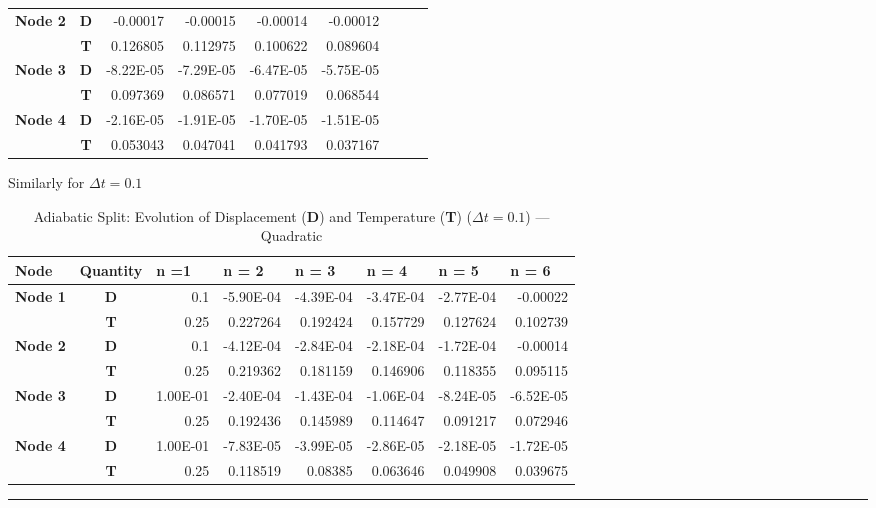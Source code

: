 \begin{table}[htbp]
\begin{tabular}{rcrrrrrrr}
    \multicolumn{1}{l}{\textbf{Node 2}} & \textbf{D} & -0.00017 & -0.00015 & -0.00014 & -0.00012 &       &       &  \\
          & \textbf{T} & 0.126805 & 0.112975 & 0.100622 & 0.089604 &       &       &  \\
    \multicolumn{1}{l}{\textbf{Node 3}} & \textbf{D} & -8.22E-05 & -7.29E-05 & -6.47E-05 & -5.75E-05 &       &       &  \\
          & \textbf{T} & 0.097369 & 0.086571 & 0.077019 & 0.068544 &       &       &  \\
    \multicolumn{1}{l}{\textbf{Node 4}} & \textbf{D} & -2.16E-05 & -1.91E-05 & -1.70E-05 & -1.51E-05 &       &       &  \\
          & \textbf{T} & 0.053043 & 0.047041 & 0.041793 & 0.037167 &       &       &  \\
\cmidrule{1-6}    \end{tabular}%
  \label{tab:addlabel}%
\end{table}
Similarly for $\Delta t = 0.1$
\begin{table}[htbp]
  \centering
  \caption{Adiabatic Split: Evolution of Displacement ({\bf D}) and Temperature ({\bf T}) ($\Delta t = 0.1$) --- Quadratic}
    \begin{tabular}{rcrrrrrr}
    \toprule
    \multicolumn{1}{l}{\textbf{Node }} & \multicolumn{1}{l}{\textbf{Quantity}} & \multicolumn{1}{l}{\textbf{n =1 }} & \multicolumn{1}{l}{\textbf{n = 2 }} & \multicolumn{1}{l}{\textbf{n = 3}} & \multicolumn{1}{l}{\textbf{n = 4}} & \multicolumn{1}{l}{\textbf{n = 5}} & \multicolumn{1}{l}{\textbf{n = 6}} \\
    \midrule
    \multicolumn{1}{l}{\textbf{Node 1}} & \textbf{D} & 0.1   & -5.90E-04 & -4.39E-04 & -3.47E-04 & -2.77E-04 & -0.00022 \\
          & \textbf{T} & 0.25  & 0.227264 & 0.192424 & 0.157729 & 0.127624 & 0.102739 \\
    \multicolumn{1}{l}{\textbf{Node 2}} & \textbf{D} & 0.1   & -4.12E-04 & -2.84E-04 & -2.18E-04 & -1.72E-04 & -0.00014 \\
          & \textbf{T} & 0.25  & 0.219362 & 0.181159 & 0.146906 & 0.118355 & 0.095115 \\
    \multicolumn{1}{l}{\textbf{Node 3}} & \textbf{D} & 1.00E-01 & -2.40E-04 & -1.43E-04 & -1.06E-04 & -8.24E-05 & -6.52E-05 \\
          & \textbf{T} & 0.25  & 0.192436 & 0.145989 & 0.114647 & 0.091217 & 0.072946 \\
    \multicolumn{1}{l}{\textbf{Node 4}} & \textbf{D} & 1.00E-01 & -7.83E-05 & -3.99E-05 & -2.86E-05 & -2.18E-05 & -1.72E-05 \\
          & \textbf{T} & 0.25  & 0.118519 & 0.08385 & 0.063646 & 0.049908 & 0.039675 \\
    \bottomrule
    \end{tabular}%
  \label{tab:addlabel}%
\end{table}\hrule\newpage
